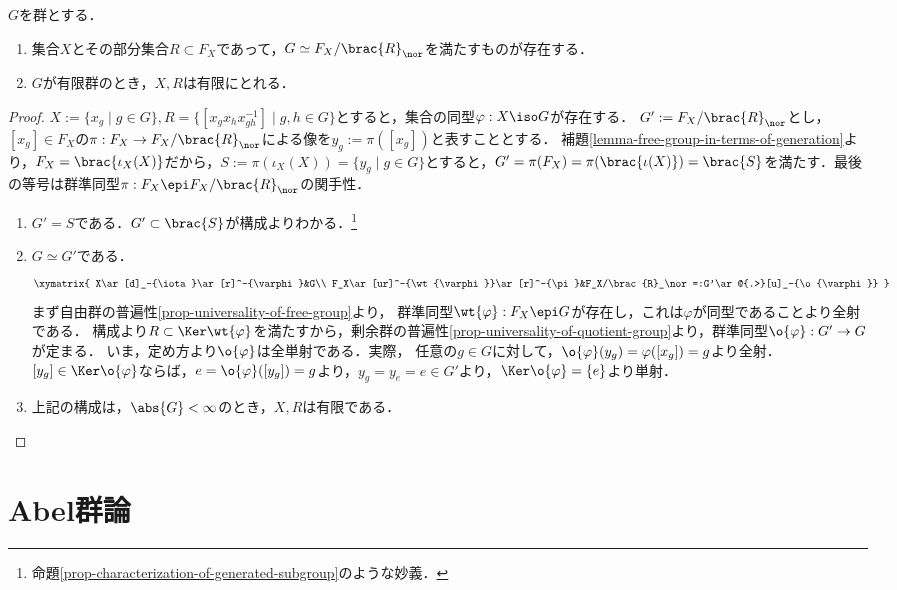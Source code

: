\documentclass[uplatex,dvipdfmx]{jsreport}
\begin{document}
\begin{proposition}[representation]
    $G$を群とする．
    \begin{enumerate}
        \item 集合$X$とその部分集合$R\subset F_X$であって，$G\simeq F_X/\brac{R}_\nor$を満たすものが存在する．
        \item $G$が有限群のとき，$X,R$は有限にとれる．
    \end{enumerate}
\end{proposition}
\begin{proof}
    $X:=\{x_g\mid g\in G\},R=\{[x_gx_hx_{gh}^{-1}]\mid g,h\in G\}$とすると，集合の同型$\varphi:X\iso G$が存在する．
    $G':=F_X/\brac{R}_\nor$とし，$[x_g]\in F_X$の$\pi:F_X\to F_X/\brac{R}_\nor$による像を$y_g:=\pi([x_g])$と表すこととする．
    補題\ref{lemma-free-group-in-terms-of-generation}より，$F_X=\brac{\iota_X(X)}$だから，$S:=\pi(\iota_X(X))=\{y_g\mid g\in G\}$とすると，$G'=\pi(F_X)=\pi(\brac{\iota(X)})=\brac{S}$を満たす．最後の等号は群準同型$\pi:F_X\epi F_X/\brac{R}_\nor$の関手性．
    \begin{enumerate}
        \item $G'=S$である．$G'\subset\brac{S}$が構成よりわかる．\footnote{命題\ref{prop-characterization-of-generated-subgroup}のような妙義．}
        \item $G\simeq G'$である．\[\xymatrix{
            X\ar[d]_-{\iota}\ar[r]^-{\varphi}&G\\
            F_X\ar[ur]^-{\wt{\varphi}}\ar[r]^-{\pi}&F_X/\brac{R}_\nor=:G'\ar@{.>}[u]_-{\o{\varphi}}
        }\]
        まず自由群の普遍性\ref{prop-universality-of-free-group}より，
        群準同型$\wt{\varphi}:F_X\epi G$が存在し，これは$\varphi$が同型であることより全射である．
        構成より$R\subset\Ker\wt{\varphi}$を満たすから，剰余群の普遍性\ref{prop-universality-of-quotient-group}より，群準同型$\o{\varphi}:G'\to G$が定まる．
        いま，定め方より$\o{\varphi}$は全単射である．実際，
        任意の$g\in G$に対して，$\o{\varphi}(y_g)=\varphi([x_g])=g$より全射．$[y_g]\in\Ker\o{\varphi}$ならば，$e=\o{\varphi}([y_g])=g$より，$y_g=y_e=e\in G'$より，$\Ker\o{\varphi}=\{e\}$より単射．
        \item 上記の構成は，$\abs{G}<\infty$のとき，$X,R$は有限である．
    \end{enumerate}
\end{proof}

\section{Abel群論}
\end{document}
